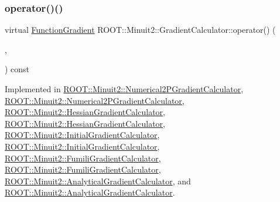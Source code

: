 \mbox{\label{classROOT_1_1Minuit2_1_1GradientCalculator_a1809c1e8a89d32aabf7835e9690c2916}} 
\subsubsection{\texorpdfstring{operator()()}{operator()()}\hspace{0.1cm}{\footnotesize\ttfamily [4/4]}}
{\footnotesize\ttfamily virtual \mbox{\hyperlink{classROOT_1_1Minuit2_1_1FunctionGradient}{Function\+Gradient}} R\+O\+O\+T\+::\+Minuit2\+::\+Gradient\+Calculator\+::operator() (\begin{DoxyParamCaption}\item[{const \mbox{\hyperlink{classROOT_1_1Minuit2_1_1MinimumParameters}{Minimum\+Parameters}} \&}]{,  }\item[{const \mbox{\hyperlink{classROOT_1_1Minuit2_1_1FunctionGradient}{Function\+Gradient}} \&}]{ }\end{DoxyParamCaption}) const\hspace{0.3cm}{\ttfamily [pure virtual]}}



Implemented in \mbox{\hyperlink{classROOT_1_1Minuit2_1_1Numerical2PGradientCalculator_a89c825ba34455277290940fa62fc5321}{R\+O\+O\+T\+::\+Minuit2\+::\+Numerical2\+P\+Gradient\+Calculator}}, \mbox{\hyperlink{classROOT_1_1Minuit2_1_1Numerical2PGradientCalculator_a9ca27ef0f61a678b528f32a002e8002b}{R\+O\+O\+T\+::\+Minuit2\+::\+Numerical2\+P\+Gradient\+Calculator}}, \mbox{\hyperlink{classROOT_1_1Minuit2_1_1HessianGradientCalculator_ae8832c265494484c65aed77f023b843f}{R\+O\+O\+T\+::\+Minuit2\+::\+Hessian\+Gradient\+Calculator}}, \mbox{\hyperlink{classROOT_1_1Minuit2_1_1HessianGradientCalculator_af6fed0f29a33ec23f97451562d41cfaa}{R\+O\+O\+T\+::\+Minuit2\+::\+Hessian\+Gradient\+Calculator}}, \mbox{\hyperlink{classROOT_1_1Minuit2_1_1InitialGradientCalculator_aca07af1a7ff9e8525c0d4d2d3633f9c5}{R\+O\+O\+T\+::\+Minuit2\+::\+Initial\+Gradient\+Calculator}}, \mbox{\hyperlink{classROOT_1_1Minuit2_1_1InitialGradientCalculator_a673e891a98df0e4a4f71442ab61084bb}{R\+O\+O\+T\+::\+Minuit2\+::\+Initial\+Gradient\+Calculator}}, \mbox{\hyperlink{classROOT_1_1Minuit2_1_1FumiliGradientCalculator_a652f65091b404ebda9a645d7ba92b3b6}{R\+O\+O\+T\+::\+Minuit2\+::\+Fumili\+Gradient\+Calculator}}, \mbox{\hyperlink{classROOT_1_1Minuit2_1_1FumiliGradientCalculator_a652f65091b404ebda9a645d7ba92b3b6}{R\+O\+O\+T\+::\+Minuit2\+::\+Fumili\+Gradient\+Calculator}}, \mbox{\hyperlink{classROOT_1_1Minuit2_1_1AnalyticalGradientCalculator_ad16442d24717c36e7d32897a2f8951c0}{R\+O\+O\+T\+::\+Minuit2\+::\+Analytical\+Gradient\+Calculator}}, and \mbox{\hyperlink{classROOT_1_1Minuit2_1_1AnalyticalGradientCalculator_a4048ce1c6e9b120f5cb808f090a90030}{R\+O\+O\+T\+::\+Minuit2\+::\+Analytical\+Gradient\+Calculator}}.



